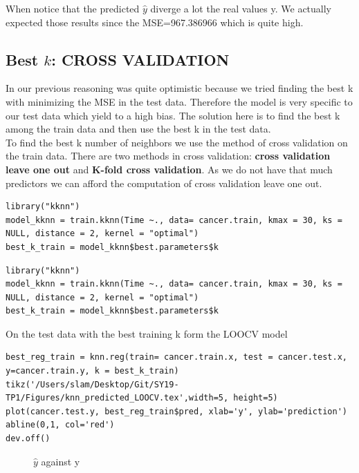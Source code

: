\documentclass[]{report}
\begin{document}
When notice that the predicted {$\hat{y}$} diverge a lot the real values y. We actually expected those results since the MSE=967.386966 which is quite high. 


\subsection{Best $k$: CROSS VALIDATION}
In our previous reasoning was quite optimistic because we tried finding the best k with minimizing the MSE in the test data. Therefore the model is very specific to our test data which yield to a high bias. The solution here is to find the best k among the train data and then use the best k in the test data. \\ 
To find the best k number of neighbors we use the method of cross validation  on the train data. There are two methods in cross validation: \textbf{cross validation leave one out} and  \textbf{K-fold cross validation}. As we do not have that much predictors we can afford the computation of cross validation leave one out.\\

\begin{lstlisting}
library("kknn")
model_kknn = train.kknn(Time ~., data= cancer.train, kmax = 30, ks = NULL, distance = 2, kernel = "optimal")
best_k_train = model_kknn$best.parameters$k
\end{lstlisting}


\begin{lstlisting}
library("kknn")
model_kknn = train.kknn(Time ~., data= cancer.train, kmax = 30, ks = NULL, distance = 2, kernel = "optimal")
best_k_train = model_kknn$best.parameters$k
\end{lstlisting}


On the test data with the best training k form the LOOCV model	
	
\begin{lstlisting}
best_reg_train = knn.reg(train= cancer.train.x, test = cancer.test.x, y=cancer.train.y, k = best_k_train)
tikz('/Users/slam/Desktop/Git/SY19-TP1/Figures/knn_predicted_LOOCV.tex',width=5, height=5)
plot(cancer.test.y, best_reg_train$pred, xlab='y', ylab='prediction')
abline(0,1, col='red')
dev.off() 
\end{lstlisting}

\begin{figure}[!h]
	\centering
	
	\caption{$\hat{y}$ against y}
\end{figure}
\end{document}
